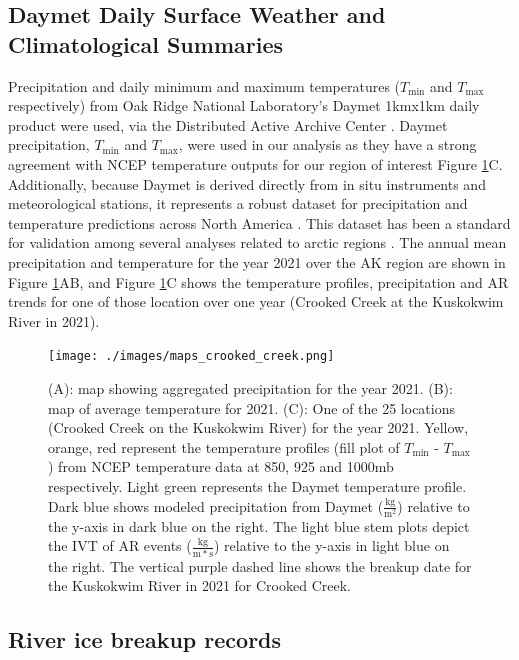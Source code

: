 \documentclass[12pts,draft]{AR_analysis_}
\begin{document}
\subsection{Daymet Daily Surface Weather and Climatological Summaries}

Precipitation and daily
minimum and maximum temperatures ($T_{\text{min}}$ and $T_{\text{max}}$ respectively) 
from Oak Ridge National
Laboratory's Daymet 1kmx1km daily product were used, via the
Distributed Active Archive Center \cite{daymet}. Daymet precipitation, 
$T_{\text{min}}$ and $T_{\text{max}}$, were used in our analysis as they
have a strong agreement with NCEP temperature outputs for our 
region of interest
Figure \ref{fig:maps_crooked_creek}C. Additionally, 
because Daymet is derived directly from in situ instruments 
and meteorological stations, it represents a robust 
dataset for precipitation and temperature predictions across North
America \cite{daymet2021}. This dataset has been a standard for validation 
among several analyses related to arctic regions \cite{Diro2019, 
Akinsanola2024}. The annual mean precipitation and 
temperature for the year 2021 over the AK region are shown in Figure 
\ref{fig:maps_crooked_creek}AB, and 
Figure \ref{fig:maps_crooked_creek}C 
shows the temperature profiles, precipitation and AR trends
for one of those location over one year (Crooked 
Creek at the Kuskokwim River in 2021). 

\begin{figure}
\centering
\texttt{[image: ./images/maps\_crooked\_creek.png]}
	\caption{(A): map showing aggregated precipitation for the
	year 2021. (B): map of average temperature for 2021. (C):
	One of the 25 locations (Crooked Creek on the Kuskokwim
	River) for the year 2021. Yellow, orange, red represent the
	temperature profiles (fill plot of $T_{\text{min}}$ -
	$T_{\text{max}}$) from NCEP
	temperature data at 850, 925 and 1000mb respectively. Light
	green represents the Daymet temperature profile. Dark blue shows
	modeled precipitation from Daymet ($\mathrm{\frac{kg}{m^{2}}}$) 
	relative to the y-axis in dark blue
	on the right. The light blue stem
	plots depict the IVT of AR events ($\mathrm{\frac{kg}{m*s}}$) 
	relative to the y-axis in light blue
	on the right. The vertical purple dashed line shows the breakup
	date for the Kuskokwim River in 2021 for Crooked Creek.}
\label{fig:maps_crooked_creek} 
\end{figure}

\subsection{River ice breakup records}
\end{document}
